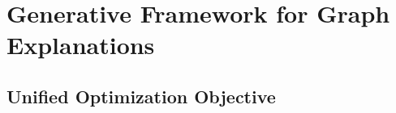 \section{Generative Framework for Graph Explanations}
\subsection{Unified Optimization Objective}\label{sec:generative_formulation}

